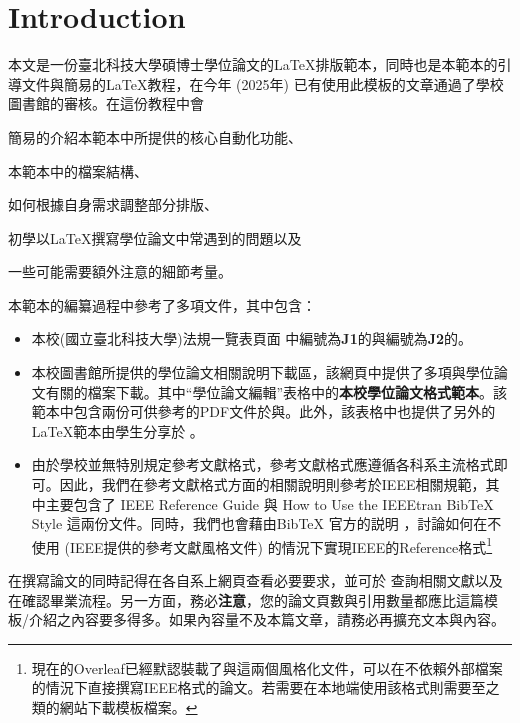 \documentclass[12pt]{report}
\theoremstyle{plain}
\renewcommand{\schoolzh}{國立臺北科技大學}
\begin{document}
\chapter{Introduction}

本文是一份臺北科技大學碩博士學位論文的\LaTeX{}排版範本，同時也是本範本的引導文件與簡易的\LaTeX{}教程，在今年 (2025年) 已有使用此模板的文章通過了學校圖書館的審核。在這份教程中會
\begin{enumerate*}
    \item 簡易的介紹本範本中所提供的核心自動化功能、
    \item 本範本中的檔案結構、
    \item 如何根據自身需求調整部分排版、
    \item 初學以\LaTeX{}撰寫學位論文中常遇到的問題以及
    \item 一些可能需要額外注意的細節考量。
\end{enumerate*}
本範本的編纂過程中參考了多項文件，其中包含：
\begin{itemize}
    \item 本校(\schoolzh)法規一覽表頁面 \cite{ntutrule} 中編號為\textbf{J1}的與編號為\textbf{J2}的。
    \item 本校圖書館所提供的學位論文相關說明下載區\cite{ntutlibdown}，該網頁中提供了多項與學位論文有關的檔案下載。其中``學位論文編輯''表格中的\textbf{本校學位論文格式範本}。該範本中包含兩份可供參考的PDF文件於與。此外，該表格中也提供了另外的\LaTeX 範本由學生分享於 。
    \item 由於學校並無特別規定參考文獻格式，參考文獻格式應遵循各科系主流格式即可。因此，我們在參考文獻格式方面的相關說明則參考於IEEE相關規範，其中主要包含了 IEEE Reference Guide \cite{ieeerefguide} 與 How to Use the IEEEtran BibTeX Style \cite{ieeebib}這兩份文件。同時，我們也會藉由BibTeX 官方的説明 \cite{bibtex}，討論如何在不使用 (IEEE提供的參考文獻風格文件) 的情況下實現IEEE的Reference格式\footnote{現在的Overleaf已經默認裝載了與這兩個風格化文件，可以在不依賴外部檔案的情況下直接撰寫IEEE格式的論文。若需要在本地端使用該格式則需要至之類的網站下載模板檔案。}
\end{itemize}
在撰寫論文的同時記得在各自系上網頁查看必要要求，並可於 \cite{ntutsheet} 查詢相關文獻以及在\cite{ntutlibcommit}確認畢業流程。另一方面，務必\textbf{注意}，您的論文頁數與引用數量都應比這篇模板/介紹之內容要多得多。如果內容量不及本篇文章，請務必再擴充文本與內容。
\end{document}
